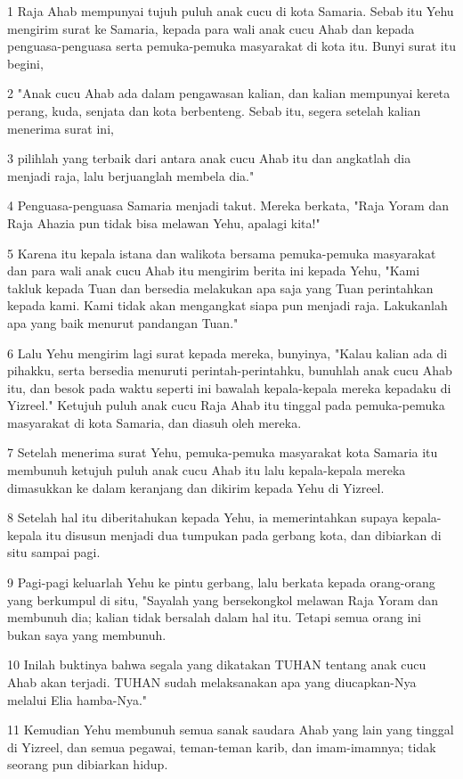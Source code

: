 \par 1 Raja Ahab mempunyai tujuh puluh anak cucu di kota Samaria. Sebab itu Yehu mengirim surat ke Samaria, kepada para wali anak cucu Ahab dan kepada penguasa-penguasa serta pemuka-pemuka masyarakat di kota itu. Bunyi surat itu begini,
\par 2 "Anak cucu Ahab ada dalam pengawasan kalian, dan kalian mempunyai kereta perang, kuda, senjata dan kota berbenteng. Sebab itu, segera setelah kalian menerima surat ini,
\par 3 pilihlah yang terbaik dari antara anak cucu Ahab itu dan angkatlah dia menjadi raja, lalu berjuanglah membela dia."
\par 4 Penguasa-penguasa Samaria menjadi takut. Mereka berkata, "Raja Yoram dan Raja Ahazia pun tidak bisa melawan Yehu, apalagi kita!"
\par 5 Karena itu kepala istana dan walikota bersama pemuka-pemuka masyarakat dan para wali anak cucu Ahab itu mengirim berita ini kepada Yehu, "Kami takluk kepada Tuan dan bersedia melakukan apa saja yang Tuan perintahkan kepada kami. Kami tidak akan mengangkat siapa pun menjadi raja. Lakukanlah apa yang baik menurut pandangan Tuan."
\par 6 Lalu Yehu mengirim lagi surat kepada mereka, bunyinya, "Kalau kalian ada di pihakku, serta bersedia menuruti perintah-perintahku, bunuhlah anak cucu Ahab itu, dan besok pada waktu seperti ini bawalah kepala-kepala mereka kepadaku di Yizreel." Ketujuh puluh anak cucu Raja Ahab itu tinggal pada pemuka-pemuka masyarakat di kota Samaria, dan diasuh oleh mereka.
\par 7 Setelah menerima surat Yehu, pemuka-pemuka masyarakat kota Samaria itu membunuh ketujuh puluh anak cucu Ahab itu lalu kepala-kepala mereka dimasukkan ke dalam keranjang dan dikirim kepada Yehu di Yizreel.
\par 8 Setelah hal itu diberitahukan kepada Yehu, ia memerintahkan supaya kepala-kepala itu disusun menjadi dua tumpukan pada gerbang kota, dan dibiarkan di situ sampai pagi.
\par 9 Pagi-pagi keluarlah Yehu ke pintu gerbang, lalu berkata kepada orang-orang yang berkumpul di situ, "Sayalah yang bersekongkol melawan Raja Yoram dan membunuh dia; kalian tidak bersalah dalam hal itu. Tetapi semua orang ini bukan saya yang membunuh.
\par 10 Inilah buktinya bahwa segala yang dikatakan TUHAN tentang anak cucu Ahab akan terjadi. TUHAN sudah melaksanakan apa yang diucapkan-Nya melalui Elia hamba-Nya."
\par 11 Kemudian Yehu membunuh semua sanak saudara Ahab yang lain yang tinggal di Yizreel, dan semua pegawai, teman-teman karib, dan imam-imamnya; tidak seorang pun dibiarkan hidup.
